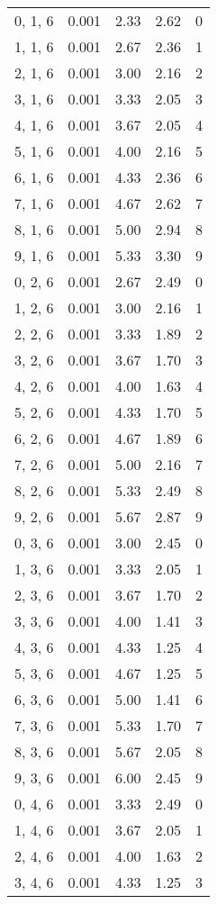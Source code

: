 \documentclass[12pt]{article}
\begin{document}
\begin{tabular}{c || c || c | c | c}
0, 1, 6 & 0.001 & 2.33 & 2.62 & 0 \\
1, 1, 6 & 0.001 & 2.67 & 2.36 & 1 \\
2, 1, 6 & 0.001 & 3.00 & 2.16 & 2 \\
3, 1, 6 & 0.001 & 3.33 & 2.05 & 3 \\
4, 1, 6 & 0.001 & 3.67 & 2.05 & 4 \\
5, 1, 6 & 0.001 & 4.00 & 2.16 & 5 \\
6, 1, 6 & 0.001 & 4.33 & 2.36 & 6 \\
7, 1, 6 & 0.001 & 4.67 & 2.62 & 7 \\
8, 1, 6 & 0.001 & 5.00 & 2.94 & 8 \\
9, 1, 6 & 0.001 & 5.33 & 3.30 & 9 \\
0, 2, 6 & 0.001 & 2.67 & 2.49 & 0 \\
1, 2, 6 & 0.001 & 3.00 & 2.16 & 1 \\
2, 2, 6 & 0.001 & 3.33 & 1.89 & 2 \\
3, 2, 6 & 0.001 & 3.67 & 1.70 & 3 \\
4, 2, 6 & 0.001 & 4.00 & 1.63 & 4 \\
5, 2, 6 & 0.001 & 4.33 & 1.70 & 5 \\
6, 2, 6 & 0.001 & 4.67 & 1.89 & 6 \\
7, 2, 6 & 0.001 & 5.00 & 2.16 & 7 \\
8, 2, 6 & 0.001 & 5.33 & 2.49 & 8 \\
9, 2, 6 & 0.001 & 5.67 & 2.87 & 9 \\
0, 3, 6 & 0.001 & 3.00 & 2.45 & 0 \\
1, 3, 6 & 0.001 & 3.33 & 2.05 & 1 \\
2, 3, 6 & 0.001 & 3.67 & 1.70 & 2 \\
3, 3, 6 & 0.001 & 4.00 & 1.41 & 3 \\
4, 3, 6 & 0.001 & 4.33 & 1.25 & 4 \\
5, 3, 6 & 0.001 & 4.67 & 1.25 & 5 \\
6, 3, 6 & 0.001 & 5.00 & 1.41 & 6 \\
7, 3, 6 & 0.001 & 5.33 & 1.70 & 7 \\
8, 3, 6 & 0.001 & 5.67 & 2.05 & 8 \\
9, 3, 6 & 0.001 & 6.00 & 2.45 & 9 \\
0, 4, 6 & 0.001 & 3.33 & 2.49 & 0 \\
1, 4, 6 & 0.001 & 3.67 & 2.05 & 1 \\
2, 4, 6 & 0.001 & 4.00 & 1.63 & 2 \\
3, 4, 6 & 0.001 & 4.33 & 1.25 & 3 \\

\end{tabular}
\end{document}
